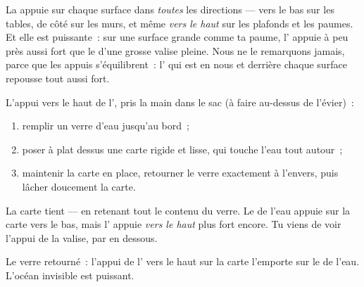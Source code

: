 \begin{proposition}\label{prop:g5:air-pressure-weather:allsides}
La  appuie sur chaque surface dans
\emph{toutes} les directions --- vers le bas sur les tables, de côté
sur les murs, et même \emph{vers le haut} sur les plafonds et les
paumes. Et elle est puissante~: sur une surface grande comme ta
paume, l' appuie à peu près aussi fort que le  d'une grosse
valise pleine. Nous ne le remarquons jamais, parce que les appuis
s'équilibrent~: l' qui est en nous et derrière chaque surface
repousse tout aussi fort.
\end{proposition}

\begin{method}\label{met:g5:air-pressure-weather:card}
L'appui vers le haut de l', pris la main dans le sac (à faire
au-dessus de l'évier)~:
\begin{enumerate}
  \item remplir un verre d'eau jusqu'au bord~;
  \item poser à plat dessus une carte rigide et lisse, qui touche
        l'eau tout autour~;
  \item maintenir la carte en place, retourner le verre exactement
        à l'envers, puis lâcher doucement la carte.
\end{enumerate}
La carte tient --- en retenant tout le contenu du verre. Le  de
l'eau appuie sur la carte vers le bas, mais l' appuie
\emph{vers le haut} plus fort encore. Tu viens de voir l'appui de la
valise, par en dessous.
\end{method}

\begin{omfigure}

{\small Le verre retourné~: l'appui de l' vers le haut sur la
carte l'emporte sur le  de l'eau. L'océan invisible est
puissant.}
\end{omfigure}

